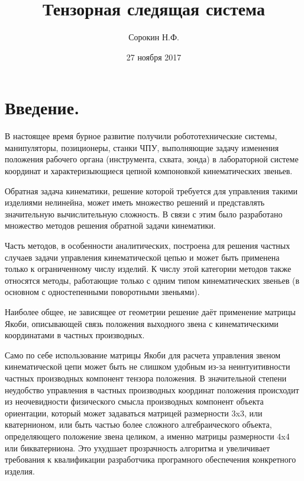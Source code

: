 \documentclass[12pt,a4paper,titlepage]{article}
\begin{document}
\date{27 ноября 2017}

\title{Тензорная следящая система}
\author{Сорокин Н.Ф.}

\maketitle
\newpage

\section{Введение.}

В настоящее время бурное развитие получили робототехнические системы, манипуляторы, позиционеры, станки ЧПУ, выполняющие задачу изменения положения рабочего органа (инструмента, схвата, зонда) в лабораторной системе координат и характеризыющиеся цепной компоновкой кинематических звеньев.

Обратная задача кинематики, решение которой требуется для управления такими изделиями нелинейна, может иметь множество решений и представлять значительную вычислительную сложность. В связи с этим было разработано множество методов решения обратной задачи кинематики.

Часть методов, в особенности аналитических, построена для решения частных случаев задачи управления кинематической цепью и может быть применена только к ограниченному числу изделий. К числу этой категории методов также относятся методы, работающие только с одним типом кинематических звеньев (в основном с одностепенными поворотными звеньями).

Наиболее общее, не зависящее от геометрии решение даёт применение матрицы Якоби, описывающей связь положения выходного звена с кинематическими координатами в частных производных.

Само по себе использование матрицы Якоби для расчета управления звеном кинематической цепи может быть не слишком удобным из-за неинтуитивности частных производных компонент тензора положения. В значительной степени неудобство управления в частных производных координат положения происходит из неочевидности физического смысла производных компонент объекта ориентации, который может задаваться матрицей размерности 3x3, или кватернионом, или быть частью более сложного алгебраического объекта, определяющего положение звена целиком, а именно матрицы размерности 4x4 или бикватерниона. Это ухудшает прозрачность алгоритма и увеличивает требования к квалификации разработчика програмного обеспечения конкретного изделия.
\end{document}
